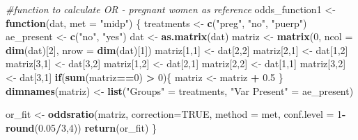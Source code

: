 \documentclass[
]{article}
\newenvironment{Shaded}{\begin{snugshade}}{\end{snugshade}}
\newcommand{\CommentTok}[1]{\textcolor[rgb]{0.56,0.35,0.01}{\textit{#1}}}
\newcommand{\ControlFlowTok}[1]{\textcolor[rgb]{0.13,0.29,0.53}{\textbf{#1}}}
\newcommand{\DataTypeTok}[1]{\textcolor[rgb]{0.13,0.29,0.53}{#1}}
\newcommand{\DecValTok}[1]{\textcolor[rgb]{0.00,0.00,0.81}{#1}}
\newcommand{\FloatTok}[1]{\textcolor[rgb]{0.00,0.00,0.81}{#1}}
\newcommand{\KeywordTok}[1]{\textcolor[rgb]{0.13,0.29,0.53}{\textbf{#1}}}
\newcommand{\NormalTok}[1]{#1}
\newcommand{\OperatorTok}[1]{\textcolor[rgb]{0.81,0.36,0.00}{\textbf{#1}}}
\newcommand{\OtherTok}[1]{\textcolor[rgb]{0.56,0.35,0.01}{#1}}
\newcommand{\StringTok}[1]{\textcolor[rgb]{0.31,0.60,0.02}{#1}}
\begin{document}
\begin{Shaded}
\begin{Highlighting}[]
\CommentTok{#function to calculate OR - pregnant women as reference}
\NormalTok{odds_function1 <-}\StringTok{ }\ControlFlowTok{function}\NormalTok{(dat, }\DataTypeTok{met =} \StringTok{"midp"}\NormalTok{) \{}
\NormalTok{  treatments <-}\StringTok{ }\KeywordTok{c}\NormalTok{(}\StringTok{"preg"}\NormalTok{, }\StringTok{"no"}\NormalTok{, }\StringTok{"puerp"}\NormalTok{)}
\NormalTok{  ae_present <-}\StringTok{ }\KeywordTok{c}\NormalTok{(}\StringTok{"no"}\NormalTok{, }\StringTok{"yes"}\NormalTok{)}
\NormalTok{  dat <-}\StringTok{ }\KeywordTok{as.matrix}\NormalTok{(dat)}
\NormalTok{  matriz <-}\StringTok{ }\KeywordTok{matrix}\NormalTok{(}\DecValTok{0}\NormalTok{, }\DataTypeTok{ncol =} \KeywordTok{dim}\NormalTok{(dat)[}\DecValTok{2}\NormalTok{], }\DataTypeTok{nrow =} \KeywordTok{dim}\NormalTok{(dat)[}\DecValTok{1}\NormalTok{])}
\NormalTok{  matriz[}\DecValTok{1}\NormalTok{,}\DecValTok{1}\NormalTok{] <-}\StringTok{ }\NormalTok{dat[}\DecValTok{2}\NormalTok{,}\DecValTok{2}\NormalTok{]}
\NormalTok{  matriz[}\DecValTok{2}\NormalTok{,}\DecValTok{1}\NormalTok{] <-}\StringTok{ }\NormalTok{dat[}\DecValTok{1}\NormalTok{,}\DecValTok{2}\NormalTok{]}
\NormalTok{  matriz[}\DecValTok{3}\NormalTok{,}\DecValTok{1}\NormalTok{] <-}\StringTok{ }\NormalTok{dat[}\DecValTok{3}\NormalTok{,}\DecValTok{2}\NormalTok{]}
\NormalTok{  matriz[}\DecValTok{1}\NormalTok{,}\DecValTok{2}\NormalTok{] <-}\StringTok{ }\NormalTok{dat[}\DecValTok{2}\NormalTok{,}\DecValTok{1}\NormalTok{]}
\NormalTok{  matriz[}\DecValTok{2}\NormalTok{,}\DecValTok{2}\NormalTok{] <-}\StringTok{ }\NormalTok{dat[}\DecValTok{1}\NormalTok{,}\DecValTok{1}\NormalTok{]}
\NormalTok{  matriz[}\DecValTok{3}\NormalTok{,}\DecValTok{2}\NormalTok{] <-}\StringTok{ }\NormalTok{dat[}\DecValTok{3}\NormalTok{,}\DecValTok{1}\NormalTok{]}
  \ControlFlowTok{if}\NormalTok{(}\KeywordTok{sum}\NormalTok{(matriz}\OperatorTok{==}\DecValTok{0}\NormalTok{) }\OperatorTok{>}\StringTok{ }\DecValTok{0}\NormalTok{)\{}
\NormalTok{    matriz <-}\StringTok{ }\NormalTok{matriz }\OperatorTok{+}\StringTok{ }\FloatTok{0.5}
\NormalTok{  \}}
  \KeywordTok{dimnames}\NormalTok{(matriz) <-}\StringTok{ }\KeywordTok{list}\NormalTok{(}\StringTok{"Groups"}\NormalTok{ =}\StringTok{ }\NormalTok{treatments, }
                           \StringTok{"Var Present"}\NormalTok{ =}\StringTok{ }\NormalTok{ae_present)}
  
\NormalTok{  or_fit <-}\StringTok{ }\KeywordTok{oddsratio}\NormalTok{(matriz, }\DataTypeTok{correction=}\OtherTok{TRUE}\NormalTok{, }\DataTypeTok{method =}\NormalTok{ met, }\DataTypeTok{conf.level =} \DecValTok{1}\OperatorTok{-}\KeywordTok{round}\NormalTok{(}\FloatTok{0.05}\OperatorTok{/}\DecValTok{3}\NormalTok{,}\DecValTok{4}\NormalTok{))}
  \KeywordTok{return}\NormalTok{(or_fit)}
\NormalTok{\}}
\end{Highlighting}
\end{Shaded}
\end{document}

